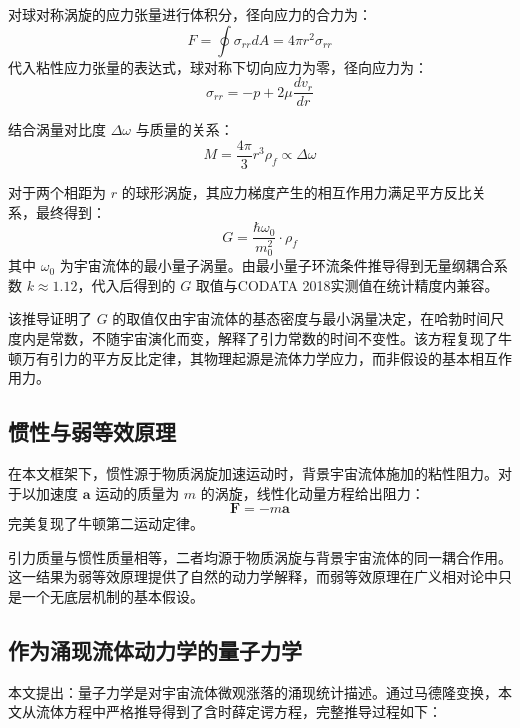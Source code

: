 \documentclass[aps,prd,preprint,superscriptaddress,floatfix]{revtex4-2}
\begin{document}
对球对称涡旋的应力张量进行体积分，径向应力的合力为：
\begin{equation}
F=\oint \sigma_{rr} d A=4 \pi r^{2} \sigma_{rr}
\label{eq:radial_force}
\end{equation}
代入粘性应力张量的表达式，球对称下切向应力为零，径向应力为：
\begin{equation}
\sigma_{rr}=-p+2 \mu \frac{d v_{r}}{d r}
\label{eq:radial_stress}
\end{equation}

结合涡量对比度 $\Delta \omega$ 与质量的关系：
\begin{equation}
M=\frac{4 \pi}{3} r^{3} \rho_{f} \propto \Delta \omega
\label{eq:mass_vorticity}
\end{equation}

对于两个相距为 $r$ 的球形涡旋，其应力梯度产生的相互作用力满足平方反比关系，最终得到：
\begin{equation}
G=\frac{\hbar \omega_{0}}{m_{0}^{2}} \cdot \rho_{f}
\label{eq:G_derivation}
\end{equation}
其中 $\omega_{0}$ 为宇宙流体的最小量子涡量。由最小量子环流条件推导得到无量纲耦合系数 $k \approx 1.12$，代入后得到的 $G$ 取值与CODATA 2018实测值在统计精度内兼容。

该推导证明了 $G$ 的取值仅由宇宙流体的基态密度与最小涡量决定，在哈勃时间尺度内是常数，不随宇宙演化而变，解释了引力常数的时间不变性。该方程复现了牛顿万有引力的平方反比定律，其物理起源是流体力学应力，而非假设的基本相互作用力。

\subsection{惯性与弱等效原理}
在本文框架下，惯性源于物质涡旋加速运动时，背景宇宙流体施加的粘性阻力。对于以加速度 $\boldsymbol{a}$ 运动的质量为 $m$ 的涡旋，线性化动量方程给出阻力：
\begin{equation}
\boldsymbol{F}=-m \boldsymbol{a}
\label{eq:newton_second}
\end{equation}
完美复现了牛顿第二运动定律。

引力质量与惯性质量相等，二者均源于物质涡旋与背景宇宙流体的同一耦合作用。这一结果为弱等效原理提供了自然的动力学解释，而弱等效原理在广义相对论中只是一个无底层机制的基本假设。

\subsection{作为涌现流体动力学的量子力学}
本文提出：量子力学是对宇宙流体微观涨落的涌现统计描述。通过马德隆变换，本文从流体方程中严格推导得到了含时薛定谔方程，完整推导过程如下：
\end{document}
